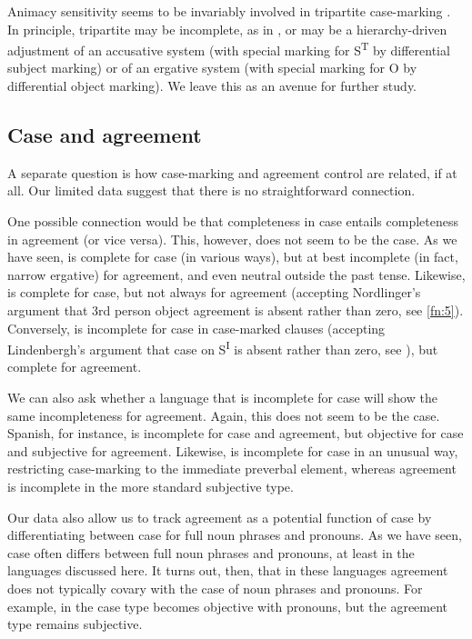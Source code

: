 \documentclass[output=paper]{langsci/langscibook}
\begin{document}
Animacy sensitivity seems to be invariably involved in tripartite case-marking
\citep{Zwart2006a}. In principle, tripartite  may be incomplete,
as in , or may be a hierarchy-driven adjustment of an accusative
system (with special marking for S\textsuperscript{T} by differential subject
marking) or of an ergative system (with special marking for O by differential
object marking).  We leave this as an avenue for further study.

\subsection{Case and agreement}\label{sec:11.5.4}

A separate question is how case-marking and agreement control are related, if
at all. Our limited data suggest that there is no straightforward connection.

One possible connection would be that completeness in case entails completeness
in agreement (or vice versa). This, however, does not seem to be the case. As
we have seen,  is complete for case (in various ways), but
at best incomplete (in fact, narrow ergative) for agreement, and even neutral
outside the past tense. Likewise,  is complete for case, but not
always for agreement (accepting Nordlinger’s argument that 3rd person object
agreement is absent rather than zero, see \cref{fn:5}). Conversely,  is incomplete for case in case-marked clauses (accepting Lindenbergh’s
argument that case on S\textsuperscript{I} is absent rather than zero, see
), but complete for agreement.

We can also ask whether a language that is incomplete for case will show the
same incompleteness for agreement. Again, this does not seem to be the case.
Spanish, for instance, is incomplete for case and agreement, but objective for
case and subjective for agreement. Likewise,  is incomplete for
case in an unusual way, restricting case-marking to the immediate preverbal
element, whereas agreement is incomplete in the more standard subjective
 type.

Our data also allow us to track agreement  as a potential
function of case  by differentiating between case for full noun
phrases and pronouns. As we have seen, case  often differs
between full noun phrases and pronouns, at least in the languages discussed
here. It turns out, then, that in these languages agreement 
does not typically covary with the case  of noun phrases and
pronouns. For example, in  the case  type becomes
objective with pronouns, but the agreement  type remains subjective.
\end{document}
